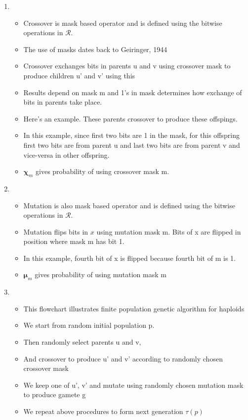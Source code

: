 \documentclass{article}
\begin{document}
\begin{enumerate}
\item
  \begin{itemize}
  \item Crossover is mask based operator and is defined using the
    bitwise operations in $\mathcal{R}$.
  \item The use of masks dates back to Geiringer, 1944  
  \item Crossover exchanges bits in parents u and v using crossover mask
  to produce children u' and v' using this
  \item Results depend on mask m and 1's in mask determines how exchange of bits in parents take place.
  \item Here's an example. These parents crossover to produce these offspings.
  \item In this example, since first two bits are 1 in the mask, for this offspring first two bits are from parent u and last two bits are from parent v and vice-versa in other offspring.
  \item $\bm{\chi}_m$ gives probability of using crossover mask m.
  \end{itemize}
  
\item
  \begin{itemize}
  \item Mutation is also mask based operator and is defined using the
    bitwise operations in $\mathcal{R}$.
  \item Mutation flips bits in $x$ using mutation mask m. Bits of x are flipped in position where mask m has bit 1.
  \item In this example, fourth bit of x is flipped because fourth bit of m is 1.
  \item $\bm{\mu}_m$ gives probability of using mutation mask m
  \end{itemize}
    
\item
  \begin{itemize}
  \item This flowchart illustrates finite population genetic algorithm for haploids
  \item We start from random initial population p.
  \item Then randomly select parents u and v, 
  \item And crossover to produce u' and v' according to randomly chosen crossover mask
  \item We keep one of u', v' and mutate using randomly chosen mutation mask to produce gamete g
  \item We repeat above procedures to form next generation $\tau(p)$
  \end{itemize}
  

\end{enumerate}
\end{document}
